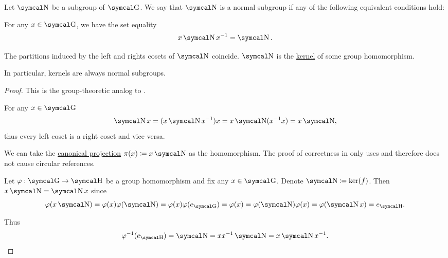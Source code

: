 \begin{definition}\label{def:normal_subgroup}
  Let \( \CN \) be a subgroup of \( \CG \). We say that \( \CN \) is a normal subgroup if any of the following equivalent conditions hold:
  \begin{DefEnum}
     For any \( x \in \CG \), we have the set equality
    \begin{equation}\label{eq:def:normal_subgroup/direct}
      x \CN x^{-1} = \CN.
    \end{equation}

     The partitions induced by the left and rights cosets of \( \CN \) coincide.
     \( \CN \) is the \hyperref[def:unital_magma_kernel]{kernel} of some group homomorphism.
  \end{DefEnum}

  In particular, kernels are always normal subgroups.
\end{definition}
\begin{proof}
  This is the group-theoretic analog to .

   For any \( x \in \CG \)
  \begin{equation*}
    \CN x = (x \CN x^{-1})x = x \CN(x^{-1}x) = x \CN,
  \end{equation*}
  thus every left coset is a right coset and vice versa.

   We can take the \hyperref[def:quotient_group]{canonical projection} \( \pi(x) \coloneqq x \CN \) as the homomorphism. The proof of correctness in  only uses  and therefore does not cause circular references.

   Let \( \varphi: \CG \to \CH \) be a group homomorphism and fix any \( x \in \CG \). Denote \( \CN \coloneqq \ker(f) \). Then \( x \CN = \CN x \) since
  \begin{equation*}
    \varphi(x \CN)
    =
    \varphi(x) \varphi(\CN)
    =
    \varphi(x) \varphi(e_{\CG})
    =
    \varphi(x)
    =
    \varphi(\CN) \varphi(x)
    =
    \varphi(\CN x)
    =
    e_{\CH}.
  \end{equation*}

  Thus
  \begin{equation*}
    \varphi^{-1}(e_{\CH}) = \CN = xx^{-1}\CN = x \CN x^{-1}.
  \end{equation*}
\end{proof}

